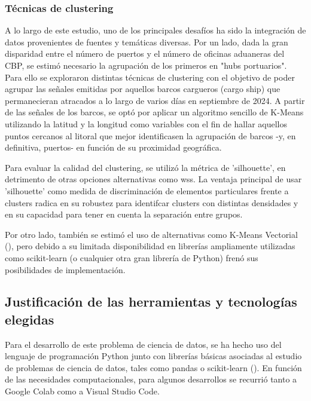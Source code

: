 \documentclass[12pt]{article}
\begin{document}
		\subsubsection{\label{clustering}Técnicas de clustering}
		A lo largo de este estudio, uno de los principales desafíos ha sido la integración de datos provenientes de fuentes y temáticas diversas. Por un lado, dada la gran disparidad entre el número de puertos y el número de oficinas aduaneras del CBP, se estimó necesario la agrupación de los primeros en "hubs portuarios". Para ello se exploraron distintas técnicas de clustering con el objetivo de poder agrupar las señales emitidas por aquellos barcos cargueros (cargo ship) que permanecieran atracados a lo largo de varios días en septiembre de 2024. A partir de las señales de los barcos, se optó por aplicar un algoritmo sencillo de K-Means utilizando la latitud y la longitud como variables con el fin de hallar aquellos puntos cercanos al litoral que mejor identificasen la agrupación de barcos -y, en definitiva, puertos- en función de su proximidad geográfica.
		
		Para evaluar la calidad del clustering, se utilizó la métrica de 'silhouette', en detrimento de otras opciones alternativas como wss. La ventaja principal de usar 'silhouette' como medida de discriminación de elementos particulares frente a clusters radica en su robustez para identifcar clusters con distintas densidades y en su capacidad para tener en cuenta la separación entre grupos.
		
		
		Por otro lado, también se estimó el uso de alternativas como K-Means Vectorial (\cite{ferreira2012vectorfieldkmeansclustering}), pero debido a su limitada disponibilidad en librerías ampliamente utilizadas como scikit-learn (o cualquier otra gran librería de Python) frenó sus posibilidades de implementación.	
	
	\subsection{Justificación de las herramientas y tecnologías elegidas}
	Para el desarrollo de este problema de ciencia de datos, se ha hecho uso del lenguaje de programación Python junto con librerías básicas asociadas al estudio de problemas de ciencia de datos, tales como pandas o scikit-learn (\cite{scikit-learn}). En función de las necesidades computacionales, para algunos desarrollos se recurrió tanto a Google Colab como a Visual Studio Code.
	
\end{document}
